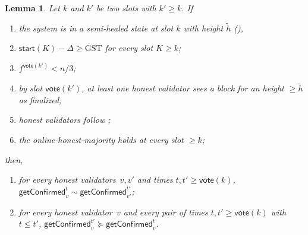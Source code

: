 \ifx\litemode\undefined\documentclass{article}\fi
\newcommand{\start}{\ensuremath{\mathsf{start}}}
\newcommand{\vote}{\ensuremath{\mathsf{vote}}}
\newcommand{\GST}{\ensuremath{\mathrm{GST}}\xspace}
\newcommand{\comm}[1]{\ensuremath{\widetilde{#1}}}
\newcommand{\getConfirmed}{\textsf{getConfirmed}\xspace}
\theoremstyle{plain}
\newtheorem{lemma}{Lemma}
\theoremstyle{definition}
\theoremstyle{remark}
\begin{document}
\begin{lemma}\label{rev:lem:full-unbounded-from-fin}
Let $k$ and $k'$ be two slots with $k' \geq k$.
If
\begin{enumerate}
  \item\label{rev:hfuf:hs} the system is in a semi-healed state at slot $k$ with height $\comm{h}$ (),
  \item\label{rev:hfuf:sync} $\start(K) - \Delta \geq \GST$ for every slot $K \geq k$;
  \item\label{rev:hfuf:f-bound} $f^{\vote(k')}<n/3$;
  \item\label{rev:hfuf:fin} by slot $\vote(k')$, at least one honest validator sees a block for an height $\geq \comm{h}$ as finalized;
  \item\label{rev:hfuf:f} honest validators follow ;
  \item\label{rev:hfuf:ohm} the online-honest-majority holds at every slot $\geq k$;
\end{enumerate}
then,
\begin{enumerate}
  \item for every honest validators~$v,v'$ and times $t, t' \geq \vote(k)$, $\getConfirmed_v^{t} \sim \getConfirmed_{v'}^{t'}$;
  \item for every honest validator~$v$ and every pair of times $t, t' \geq \vote(k)$ with $t \leq t'$, $\getConfirmed_v^{t'} \succeq \getConfirmed_v^t$.
\end{enumerate}
\end{lemma}
\end{document}
